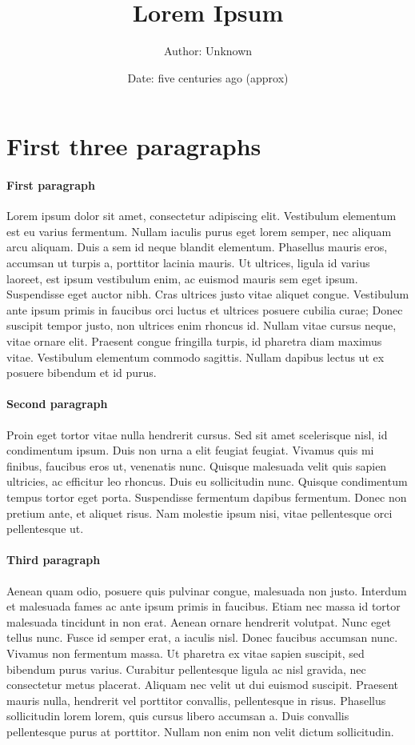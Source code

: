 \documentclass[12pt]{article}
\title{Lorem Ipsum}
\author{Author: Unknown}
\date{Date: five centuries ago (approx)}
\begin{document}
\maketitle

\section{First three paragraphs}

\paragraph{First paragraph}

Lorem ipsum dolor sit amet, consectetur adipiscing elit. Vestibulum elementum est eu varius fermentum. Nullam iaculis purus eget lorem semper, nec aliquam arcu aliquam. Duis a sem id neque blandit elementum. Phasellus mauris eros, accumsan ut turpis a, porttitor lacinia mauris. Ut ultrices, ligula id varius laoreet, est ipsum vestibulum enim, ac euismod mauris sem eget ipsum. Suspendisse eget auctor nibh. Cras ultrices justo vitae aliquet congue. Vestibulum ante ipsum primis in faucibus orci luctus et ultrices posuere cubilia curae; Donec suscipit tempor justo, non ultrices enim rhoncus id. Nullam vitae cursus neque, vitae ornare elit. Praesent congue fringilla turpis, id pharetra diam maximus vitae. Vestibulum elementum commodo sagittis. Nullam dapibus lectus ut ex posuere bibendum et id purus.

\paragraph{Second paragraph}

Proin eget tortor vitae nulla hendrerit cursus. Sed sit amet scelerisque nisl, id condimentum ipsum. Duis non urna a elit feugiat feugiat. Vivamus quis mi finibus, faucibus eros ut, venenatis nunc. Quisque malesuada velit quis sapien ultricies, ac efficitur leo rhoncus. Duis eu sollicitudin nunc. Quisque condimentum tempus tortor eget porta. Suspendisse fermentum dapibus fermentum. Donec non pretium ante, et aliquet risus. Nam molestie ipsum nisi, vitae pellentesque orci pellentesque ut.

\paragraph{Third paragraph}

Aenean quam odio, posuere quis pulvinar congue, malesuada non justo. Interdum et malesuada fames ac ante ipsum primis in faucibus. Etiam nec massa id tortor malesuada tincidunt in non erat. Aenean ornare hendrerit volutpat. Nunc eget tellus nunc. Fusce id semper erat, a iaculis nisl. Donec faucibus accumsan nunc. Vivamus non fermentum massa. Ut pharetra ex vitae sapien suscipit, sed bibendum purus varius. Curabitur pellentesque ligula ac nisl gravida, nec consectetur metus placerat. Aliquam nec velit ut dui euismod suscipit. Praesent mauris nulla, hendrerit vel porttitor convallis, pellentesque in risus. Phasellus sollicitudin lorem lorem, quis cursus libero accumsan a. Duis convallis pellentesque purus at porttitor. Nullam non enim non velit dictum sollicitudin.
\end{document}

